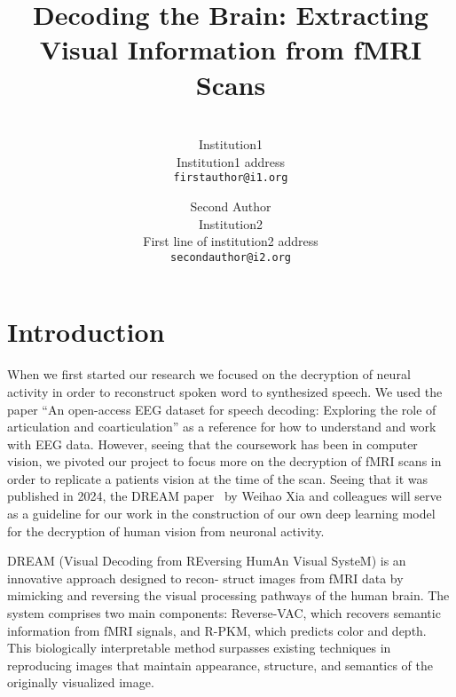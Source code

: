 \documentclass[10pt,twocolumn,letterpaper]{article}
\begin{document}
\title{Decoding the Brain: Extracting Visual Information from fMRI Scans}

\author{\\
Institution1\\
Institution1 address\\
{\tt\small firstauthor@i1.org}
\and
Second Author\\
Institution2\\
First line of institution2 address\\
{\tt\small secondauthor@i2.org}
}
\maketitle


\section{Introduction}
\label{sec:intro}

When we first started our research we focused on the
decryption of neural activity in order to reconstruct spoken
word to synthesized speech. We used the paper ``An open-access EEG dataset
 for speech decoding: Exploring the role of articulation and coarticulation''
 \cite{moreira2022open} as a reference for how to understand and work with EEG data. 
However,
seeing that the coursework has been in computer vision, we
pivoted our project to focus more on the decryption of fMRI
scans in order to replicate a patients vision at the time of the
scan. Seeing that it was published in 2024, the DREAM paper~\cite{xia2024dream} 
by Weihao Xia and colleagues will serve as a guideline for our work in the 
construction of our own deep learning model for the decryption of human vision from neuronal
activity.

DREAM (Visual Decoding from REversing HumAn Visual SysteM) is an innovative approach designed to recon-
struct images from fMRI data by mimicking and reversing the visual processing pathways of the human brain.
The system comprises two main components: Reverse-VAC, which recovers semantic
information from fMRI signals, and R-PKM, which predicts color and depth. This biologically interpretable method surpasses existing
techniques in reproducing images that maintain appearance, structure, and semantics of the originally visualized image.
\end{document}
